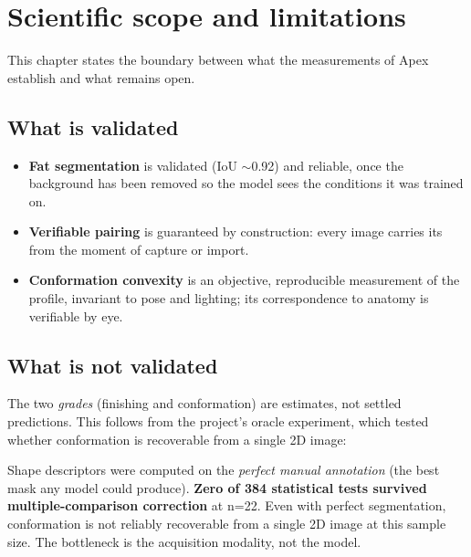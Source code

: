 \chapter{Scientific scope and limitations}


\vspace{4pt}
This chapter states the boundary between what the measurements of Apex establish
and what remains open.

\section{What is validated}

\begin{itemize}[leftmargin=1.3em,itemsep=3pt]
  \item \textbf{Fat segmentation} is validated (IoU $\sim$0.92) and reliable, once
        the background has been removed so the model sees the conditions it was
        trained on.
  \item \textbf{Verifiable pairing} is guaranteed by construction: every image
        carries its  from the moment of capture or import.
  \item \textbf{Conformation convexity} is an objective, reproducible measurement
        of the profile, invariant to pose and lighting; its correspondence to
        anatomy is verifiable by eye.
\end{itemize}

\section{What is not validated}

The two \emph{grades} (finishing and conformation) are estimates, not
settled predictions. This follows from the project's oracle experiment, which
tested whether conformation is recoverable from a single 2D image:

\begin{caution}[title=The oracle result]
Shape descriptors were computed on the \emph{perfect manual annotation} (the best
mask any model could produce). \textbf{Zero of 384 statistical tests survived
multiple-comparison correction} at n=22. Even with perfect segmentation,
conformation is not reliably recoverable from a single 2D image at this sample
size. The bottleneck is the acquisition modality, not the model.
\end{caution}

